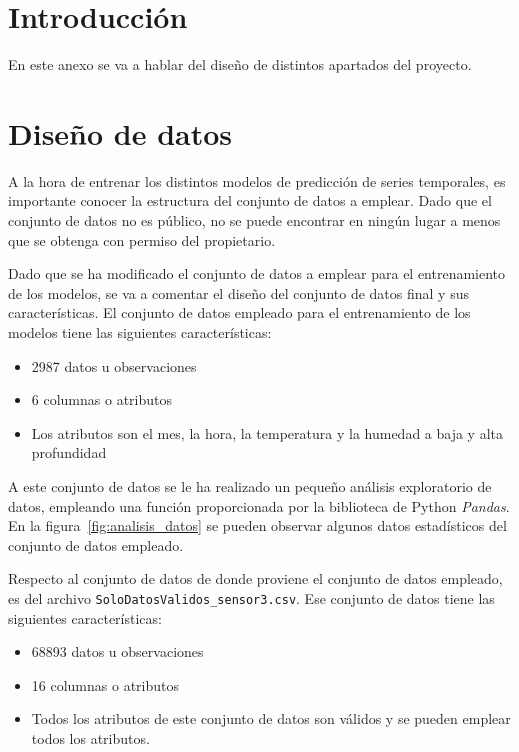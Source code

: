 
\section{Introducción}

En este anexo se va a hablar del diseño de distintos apartados del proyecto.

\section{Diseño de datos}

A la hora de entrenar los distintos modelos de predicción de series temporales, es importante conocer la estructura del conjunto de datos a emplear. Dado que el conjunto de datos no es público, no se puede encontrar en ningún lugar a menos que se obtenga con permiso del propietario.

\par

Dado que se ha modificado el conjunto de datos a emplear para el entrenamiento de los modelos, se va a comentar el diseño del conjunto de datos final y sus características. El conjunto de datos empleado para el entrenamiento de los modelos tiene las siguientes características: 

\begin{itemize}
    \item 2987 datos u observaciones
    \item 6 columnas o atributos
    \item Los atributos son el mes, la hora, la temperatura y la humedad a baja y alta profundidad
\end{itemize}

A este conjunto de datos se le ha realizado un pequeño análisis exploratorio de datos, empleando una función proporcionada por la biblioteca de Python \textit{Pandas}. En la figura~\ref{fig:analisis_datos} se pueden observar algunos datos estadísticos del conjunto de datos empleado.


Respecto al conjunto de datos de donde proviene el conjunto de datos empleado, es del archivo \texttt{SoloDatosValidos\_sensor3.csv}. Ese conjunto de datos tiene las siguientes características:

\begin{itemize}
    \item 68893 datos u observaciones
    \item 16 columnas o atributos
    \item Todos los atributos de este conjunto de datos son válidos y se pueden emplear todos los atributos.
\end{itemize}


